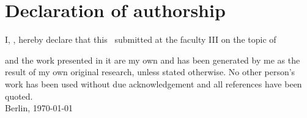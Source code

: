 \chapter*{Declaration of authorship}

I, \myauthor, hereby declare that this \mysubject\ submitted at the faculty III on the topic of
\vspace{0.5cm}
\begin{center}
	\textbf{\mytitle}
\end{center}
\vspace{0.5cm}
and the work presented in it are my own and has been generated by me as the result of my own original research, unless stated otherwise. No other person’s work has been used without due acknowledgement and all references have been quoted.
\\[4ex]
Berlin, \today \\
\\[2cm] 
\myauthor

